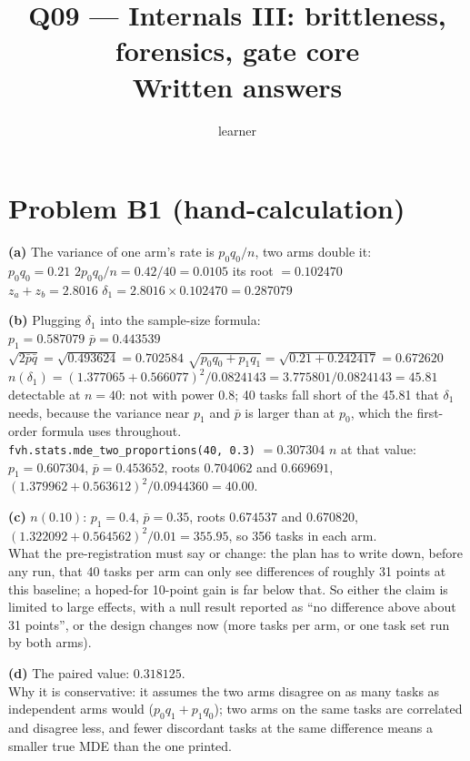 \documentclass[11pt]{article}
\title{Q09 --- Internals III: brittleness, forensics, gate core \\ \large Written answers}
\author{learner}
\date{}
\begin{document}
\sloppy
\maketitle

\section*{Problem B1 (hand-calculation)}\label{ans:B1}
\begin{answer}
\textbf{(a)} The variance of one arm's rate is $p_0 q_0 / n$, two arms double it: \\
$p_0 q_0 = 0.21$ \quad $2 p_0 q_0 / n = 0.42/40 = 0.0105$ \quad its root $= 0.102470$ \\
$z_a + z_b = 2.8016$ \quad $\delta_1 = 2.8016 \times 0.102470 = 0.287079$

\textbf{(b)} Plugging $\delta_1$ into the sample-size formula: \\
$p_1 = 0.587079$ \quad $\bar p = 0.443539$ \\
$\sqrt{2 \bar p \bar q} = \sqrt{0.493624} = 0.702584$ \quad
$\sqrt{p_0 q_0 + p_1 q_1} = \sqrt{0.21 + 0.242417} = 0.672620$ \\
$n(\delta_1) = (1.377065 + 0.566077)^2 / 0.0824143 = 3.775801/0.0824143 = 45.81$
\quad detectable at $n = 40$: not with power 0.8; 40 tasks fall short of the
45.81 that $\delta_1$ needs, because the variance near $p_1$ and $\bar p$ is
larger than at $p_0$, which the first-order formula uses throughout. \\
\texttt{fvh.stats.mde\_two\_proportions(40, 0.3)} $= 0.307304$ \quad $n$ at that
value: $p_1 = 0.607304$, $\bar p = 0.453652$, roots $0.704062$ and $0.669691$,
$(1.379962 + 0.563612)^2 / 0.0944360 = 40.00$.

\textbf{(c)} $n(0.10)$: $p_1 = 0.4$, $\bar p = 0.35$, roots $0.674537$ and
$0.670820$, $(1.322092 + 0.564562)^2/0.01 = 355.95$, so 356 tasks in each arm. \\
What the pre-registration must say or change: the plan has to write down, before
any run, that 40 tasks per arm can only see differences of roughly 31 points at
this baseline; a hoped-for 10-point gain is far below that. So either the
claim is limited to large effects, with a null result reported as ``no
difference above about 31 points'', or the design changes now (more tasks per
arm, or one task set run by both arms).

\textbf{(d)} The paired value: $0.318125$. \\
Why it is conservative: it assumes the two arms disagree on as many tasks as
independent arms would ($p_0 q_1 + p_1 q_0$); two arms on the same tasks are
correlated and disagree less, and fewer discordant tasks at the same
difference means a smaller true MDE than the one printed.
\end{answer}
\end{document}
